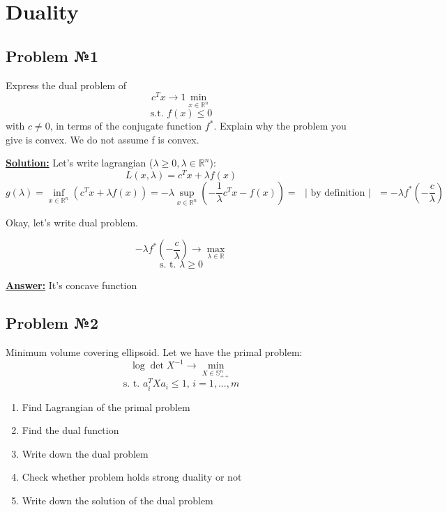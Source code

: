\section{Duality}

\subsection{Problem №1}
Express the dual problem of
\begin{equation*}
    c^Tx \rightarrow 1\min_{x \in \mathds{R}^n}
\end{equation*}
\begin{equation*}
    \text{s.t. } f(x) \leq 0
\end{equation*}
with $c \not = 0$, in terms of the conjugate function $f^*$. Explain why the problem you give is convex. We do not assume f is convex.

\underline{\textbf{Solution:}}
Let's write lagrangian ($\lambda \geq 0, \lambda \in \mathds{R}^n$):
\begin{equation*}
    L(x, \lambda) = c^Tx + \lambda f(x) 
\end{equation*}
\begin{equation*}
    g(\lambda) = \inf_{x \in \mathds{R}^n}(c^Tx + \lambda f(x)) = - \lambda \sup_{x \in \mathds{R}^n} (-\frac{1}{\lambda}c^Tx - f(x)) = \text{ } | \text{ by definition } | \text{ } = - \lambda f^*(-\frac{c}{\lambda}) 
\end{equation*}

Okay, let's write dual problem.

\begin{equation*}
    -\lambda f^*(-\frac{c}{\lambda}) \rightarrow \max_{\lambda \in \mathds{R}}
\end{equation*}
\begin{equation*}
    \text{s. t. } \lambda \geq 0
\end{equation*}

\underline{\textbf{Answer:}} It's concave function

\subsection{Problem №2}
Minimum volume covering ellipsoid. Let we have the primal problem:
\begin{equation*}
    \log \det X^{-1} \rightarrow \min_{X \in \mathds{S}_{++}^n}
\end{equation*}
\begin{equation*}
    \text{s. t. } a_i^TXa_i \leq 1 \text{, } i = 1, ..., m
\end{equation*}
\begin{enumerate}
    \item Find Lagrangian of the primal problem
    \item Find the dual function
    \item Write down the dual problem
    \item Check whether problem holds strong duality or not
    \item Write down the solution of the dual problem
\end{enumerate}

